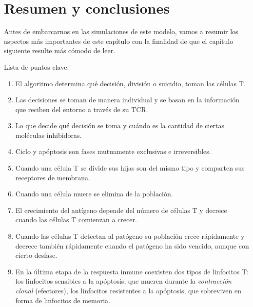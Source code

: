 \section{Resumen y conclusiones}

Antes de embarcarnos en las simulaciones de este modelo, vamos a resumir los aspectos más importantes de este capítulo con la finalidad de que el capítulo siguiente resulte más cómodo de leer.

Lista de puntos clave:

\begin{enumerate}
	\item El algoritmo determina qué decisión, división o suicidio, toman las células T.
	\item Las decisiones se toman de manera individual y se basan en la información que reciben del entorno a través de su TCR.
	\item Lo que decide qué decisión se toma y cuándo es la cantidad de ciertas moléculas inhibidoras.
	\item Ciclo y apóptosis son fases mutuamente exclusivas e irreversibles.
	\item Cuando una célula T se divide sus hijas son del mismo tipo y comparten sus receptores de membrana.
	\item Cuando una célula muere se elimina de la población.
	\item El crecimiento del antígeno depende del número de células T y decrece cuando las células T comienzan a crecer.
	\item Cuando las células T detectan al patógeno su población crece rápidamente y decrece también rápidamente cuando el patógeno ha sido vencido, aunque con cierto desfase.
	\item En la última etapa de la respuesta inmune coexisten dos tipos de linfocitos T: los linfocitos sensibles a la apóptosis, que mueren durante la \textit{contracción clonal} (efectores), los linfocitos resistentes a la apóptosis, que	sobreviven en forma de linfocitos de memoria.
\end{enumerate} 




